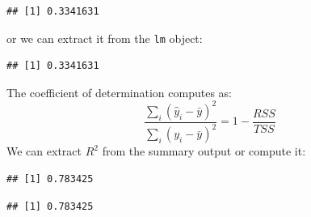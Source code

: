 \documentclass[
]{book}
\newenvironment{Shaded}{\begin{snugshade}}{\end{snugshade}}
\newcommand{\DecValTok}[1]{\textcolor[rgb]{0.00,0.00,0.81}{#1}}
\newcommand{\FunctionTok}[1]{\textcolor[rgb]{0.13,0.29,0.53}{\textbf{#1}}}
\newcommand{\NormalTok}[1]{#1}
\newcommand{\SpecialCharTok}[1]{\textcolor[rgb]{0.81,0.36,0.00}{\textbf{#1}}}
\begin{document}
\begin{verbatim}
## [1] 0.3341631
\end{verbatim}

or we can extract it from the \texttt{lm} object:

\begin{Shaded}
\end{Shaded}

\begin{verbatim}
## [1] 0.3341631
\end{verbatim}

The coefficient of determination computes as:
\[ \frac{\sum_i (\hat{y}_i - \bar{y})^2}{\sum_i (y_i - \bar{y})^2} = 1 - \frac{RSS}{TSS}\]
We can extract \(R^2\) from the summary output or compute it:

\begin{Shaded}
\end{Shaded}

\begin{verbatim}
## [1] 0.783425
\end{verbatim}

\begin{Shaded}
\end{Shaded}

\begin{verbatim}
## [1] 0.783425
\end{verbatim}

\begin{Shaded}
\end{Shaded}
\end{document}
